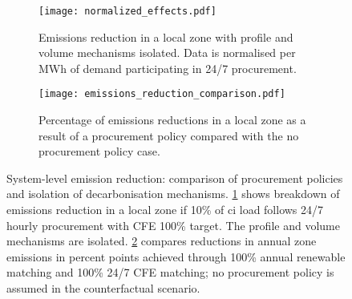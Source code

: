 \documentclass[11pt, 5p, nopreprintline]{elsarticle}
\begin{document}
\begin{figure}[H]
    \centering

    \begin{subfigure}[t]{\columnwidth}
        \centering
        \caption{Emissions reduction in a local zone with profile and volume mechanisms isolated. Data is normalised per MWh of demand participating in 24/7 procurement.}
        \texttt{[image: normalized\_effects.pdf]}
        \label{fig:10-profile-volume.pdf}
    \end{subfigure}

    \begin{subfigure}[t]{\columnwidth}
        \centering
        \caption{Percentage of emissions reductions in a local zone as a result of a procurement policy compared with the no procurement policy case.}
        \texttt{[image: emissions\_reduction\_comparison.pdf]}
        \label{fig:10-hourly-annual.pdf}
    \end{subfigure}

    \caption{
        System-level emission reduction: comparison of procurement policies and isolation of decarbonisation mechanisms.
        \cref{fig:10-profile-volume.pdf} shows breakdown of emissions reduction in a local zone if 10\% of \gls{ci} load follows 24/7 hourly procurement with CFE 100\% target. The profile and volume mechanisms are isolated.
        \cref{fig:10-hourly-annual.pdf} compares reductions in annual zone emissions in percent points achieved through 100\% annual renewable matching and 100\% 24/7 CFE matching; no procurement policy is assumed in the counterfactual scenario.}
        \label{fig:decarbonisation_story}

\end{figure}
\end{document}
